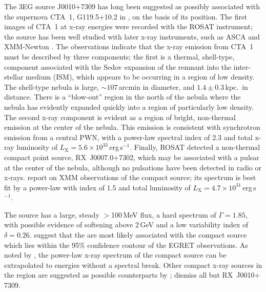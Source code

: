 The 3EG source J0010$+$7309 has long been suggested as possibly
associated with the supernova CTA~1, G119.5$+$10.2 in
\citet{REF::GREEN::WEB2001}, on the basis of its position. The
first images of CTA~1 at x-ray energies were recorded with the ROSAT
instrument; the source has been well studied with later x-ray
instruments, such as ASCA and XMM-Newton
\citep{REF::SEWARD::APJ1995, REF::SLANE::APJ1997, REF::SLANE::APJ2004}.
The observations indicate that the x-ray emission from CTA~1 must be
described by three components; the first is a thermal, shell-type,
component associated with the Sedov expansion of the remnant into the
inter-stellar medium (ISM), which appears to be occurring in a region
of low density. The shell-type nebula is large,
$\sim107$\,arcmin in diameter, and $1.4\pm0.3$\,kpc.\ in
distance. There is a ``blow-out'' region in the north of the nebula
where the nebula has evidently expanded quickly into a region of
particularly low density. The second x-ray component is evident as
a region of bright, non-thermal emission at the center of the
nebula. This emission is consistent with synchrotron emission from a
central PWN, with a power-law spectral index of 2.3 and total x-ray
luminosity of $L_\mathrm{X}=5.6\times10^{33}$\,erg\,s$^{-1}$. Finally,
ROSAT detected a non-thermal compact point source, RX~J0007.0$+$7302,
which may be associated with a pulsar at the center of the
nebula, although no pulsations have been detected in radio or
x-rays. \citet{REF::SLANE::APJ2004} report on
XMM observations of the compact source; its spectrum is
best fit by a power-law with index of 1.5 and total luminosity of
$L_\mathrm{X}=4.7\times10^{31}$\,erg\,s$^{-1}$.

The \Gray source has a large, steady $>$100\,MeV flux, a hard spectrum
of $\Gamma=1.85$, with possible evidence of softening above 2\,GeV and
a low variability index of
$\delta=0.26$. \citet{REF::BRAZIER::MNRAS1998} suggest that the \Grays
are most likely associated with the compact source which lies within
the 95\% confidence contour of the EGRET observations.  As noted by
\citet{REF::SLANE::APJ2004}, the power-law x-ray spectrum of the
compact source can be extrapolated to \Gray energies without a
spectral break. Other compact x-ray sources in the region are
suggested as possible counterparts by
\citet{REF::SEWARD::APJ1995}; \citet{REF::BRAZIER::MNRAS1998} dismiss
all but RX~J0010$+$7309.

